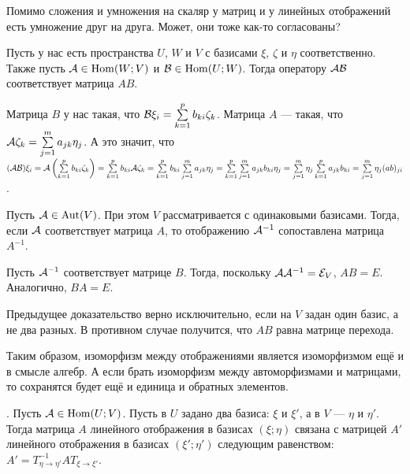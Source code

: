 \documentclass{article}
\newcommand*{\id}{{\scriptE}}
\begin{document}
\begin{itemize}
\begin{Proof}
        \end{Proof}
        \begin{Comment}
            Помимо сложения и умножения на скаляр у матриц и у линейных отображений есть умножение друг на друга. Может, они тоже как-то согласованы?
        \end{Comment}
        \thm Пусть у нас есть пространства $U$, $W$ и $V$ с базисами $\xi$, $\zeta$ и $\eta$ соответственно. Также пусть ${\mathcal{A}}\in\operatorname{Hom}(W;V)$ и ${\mathcal{B}}\in\operatorname{Hom}(U;W)$. Тогда оператору ${\mathcal{A}}{\mathcal{B}}$ соответствует матрица $AB$.
        \begin{Proof}
            Матрица $B$ у нас такая, что ${\mathcal{B}}\xi_i=\sum\limits_{k=1}^pb_{ki}\zeta_k$. Матрица $A$ --- такая, что ${\mathcal{A}}\zeta_k=\sum\limits_{j=1}^ma_{jk}\eta_j$. А это значит, что $({\mathcal{A}}{\mathcal{B}})\xi_i={\mathcal{A}}\left(\sum\limits_{k=1}^pb_{ki}\zeta_k\right)=\sum\limits_{k=1}^pb_{ki}{\mathcal{A}}\zeta_k=\sum\limits_{k=1}^pb_{ki}\sum\limits_{j=1}^ma_{jk}\eta_j=\sum\limits_{k=1}^p\sum\limits_{j=1}^ma_{jk}b_{ki}\eta_j=\sum\limits_{j=1}^m\eta_j\sum\limits_{k=1}^pa_{jk}b_{ki}=\sum\limits_{j=1}^m\eta_j(ab)_{ji}$.
        \end{Proof}
        \thm Пусть ${\mathcal{A}}\in\operatorname{Aut}(V)$. При этом $V$ рассматривается с одинаковыми базисами. Тогда, если ${\mathcal{A}}$ соответствует матрица $A$, то отображению ${\mathcal{A}}^{-1}$ сопоставлена матрица $A^{-1}$.
        \begin{Proof}
            Пусть ${\mathcal{A}}^{-1}$ соответствует матрице $B$. Тогда, поскольку $\scriptA\scriptA^{-1}=\id_V$, $AB=E$. Аналогично, $BA=E$.
        \end{Proof}
        \begin{Comment}
            Предыдущее доказательство верно исключительно, если на $V$ задан один базис, а не два разных. В противном случае получится, что $AB$ равна матрице перехода.
        \end{Comment}
        \begin{Comment}
            Таким образом, изоморфизм между отображениями является изоморфизмом ещё и в смысле алгебр. А если брать изоморфизм между автоморфизмами и матрицами, то сохранятся будет ещё и единица и обратных элементов.
        \end{Comment}
        \thm {}. Пусть ${\mathcal{A}}\in\operatorname{Hom}(U;V)$. Пусть в $U$ задано два базиса: $\xi$ и $\xi'$, а в $V$ --- $\eta$ и $\eta'$. Тогда матрица $A$ линейного отображения в базисах $(\xi;\eta)$ связана с матрицей $A'$ линейного отображения в базисах $(\xi';\eta')$ следующим равенством: $A'=T^{-1}_{\eta\to\eta'}AT_{\xi\to\xi'}$.

\end{itemize}
\end{document}
